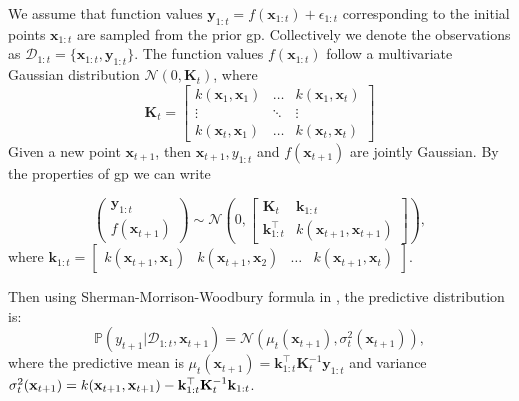 
We assume that function values ${\mathbf{y}}_{1:t} = f(\mathbf{x}_{1:t})+\epsilon_{1:t}$ corresponding to the initial points $\mathbf{x}_{1:t}$ are sampled
from the prior \ac{gp}. Collectively we denote the observations as $\mathcal{D}_{1:t} = \{\mathbf{x}_{1:t}, \mathbf{y}_{1:t}\}$. The function
values $f(\mathbf{x}_{1:t})$ follow a multivariate Gaussian distribution $\mathcal{N}(0, \mathbf{K}_t)$, where
\[ \mathbf{K}_t = \begin{bmatrix} 
    k(\mathbf{x}_1, \mathbf{x}_1) & \dots  & k(\mathbf{x}_1, \mathbf{x}_t)\\
    \vdots & \ddots & \vdots\\
    k(\mathbf{x}_t, \mathbf{x}_1) & \dots  & k(\mathbf{x}_t, \mathbf{x}_t)
    \end{bmatrix}
\]
Given a new point $\mathbf{x}_{t+1}$, then $\mathbf{x}_{t+1},  y_{1:t}$ and $f(\mathbf{x}_{t+1})$ are jointly Gaussian. By the properties of \ac{gp} we can write

\[
\begin{pmatrix}
\mathbf{y}_{1:t} \\
f(\mathbf{x}_{t+1})
\end{pmatrix} \sim \mathcal{N}\left(0, \begin{bmatrix}
\mathbf{K}_t & \mathbf{k}_{1:t} \\
\mathbf{k}_{1:t}^\top & k(\mathbf{x}_{t+1}, \mathbf{x}_{t+1})
\end{bmatrix} \right), 
\]
where $\mathbf{k}_{1:t} = \begin{bmatrix}
k(\mathbf{x}_{t+1}, \mathbf{x}_1) & k(\mathbf{x}_{t+1}, \mathbf{x}_2) & \dots & k(\mathbf{x}_{t+1}, \mathbf{x}_t)
\end{bmatrix}$.

Then using Sherman-Morrison-Woodbury formula in \citet{rasmussen2006gaussian}, the predictive distribution is:
\[ \mathbb{P}(y_{t+1} \lvert \mathcal{D}_{1:t}, \mathbf{x}_{t+1})= \mathcal{N}(\mu_t(\mathbf{x}_{t+1}), \sigma_t^2(\mathbf{x}_{t+1})), 
\]
where the predictive mean is $\mu_t(\mathbf{x}_{t+1}) = \mathbf{k}_{1:t}^\top \mathbf{K}_t^{-1} \mathbf{y}_{1:t}$ and variance $\sigma_{t}^{2}({\bf x}_{t+1}) = k({\bf x}_{t+1},{\bf x}_{t+1})-{\bf k}_{1:t}^{\top} \mathbf{K}_t^{-1}{\bf k}_{1:t}$. 

